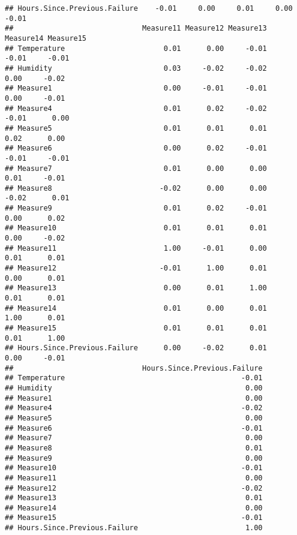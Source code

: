 \documentclass[
]{article}
\begin{document}
\begin{verbatim}
## Hours.Since.Previous.Failure    -0.01     0.00     0.01     0.00     -0.01
##                              Measure11 Measure12 Measure13 Measure14 Measure15
## Temperature                       0.01      0.00     -0.01     -0.01     -0.01
## Humidity                          0.03     -0.02     -0.02      0.00     -0.02
## Measure1                          0.00     -0.01     -0.01      0.00     -0.01
## Measure4                          0.01      0.02     -0.02     -0.01      0.00
## Measure5                          0.01      0.01      0.01      0.02      0.00
## Measure6                          0.00      0.02     -0.01     -0.01     -0.01
## Measure7                          0.01      0.00      0.00      0.01     -0.01
## Measure8                         -0.02      0.00      0.00     -0.02      0.01
## Measure9                          0.01      0.02     -0.01      0.00      0.02
## Measure10                         0.01      0.01      0.01      0.00     -0.02
## Measure11                         1.00     -0.01      0.00      0.01      0.01
## Measure12                        -0.01      1.00      0.01      0.00      0.01
## Measure13                         0.00      0.01      1.00      0.01      0.01
## Measure14                         0.01      0.00      0.01      1.00      0.01
## Measure15                         0.01      0.01      0.01      0.01      1.00
## Hours.Since.Previous.Failure      0.00     -0.02      0.01      0.00     -0.01
##                              Hours.Since.Previous.Failure
## Temperature                                         -0.01
## Humidity                                             0.00
## Measure1                                             0.00
## Measure4                                            -0.02
## Measure5                                             0.00
## Measure6                                            -0.01
## Measure7                                             0.00
## Measure8                                             0.01
## Measure9                                             0.00
## Measure10                                           -0.01
## Measure11                                            0.00
## Measure12                                           -0.02
## Measure13                                            0.01
## Measure14                                            0.00
## Measure15                                           -0.01
## Hours.Since.Previous.Failure                         1.00
\end{verbatim}
\end{document}
